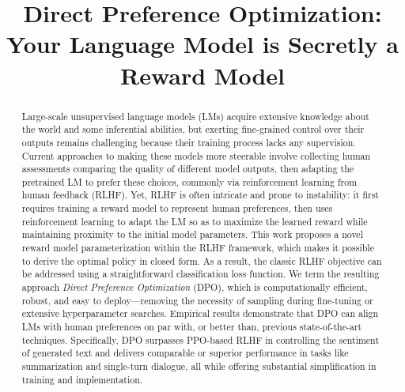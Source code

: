 \title{Direct Preference Optimization: Your Language Model is Secretly a Reward Model}

\begin{abstract}
Large-scale unsupervised language models (LMs) acquire extensive knowledge about the world and some inferential abilities, but exerting fine-grained control over their outputs remains challenging because their training process lacks any supervision. Current approaches to making these models more steerable involve collecting human assessments comparing the quality of different model outputs, then adapting the pretrained LM to prefer these choices, commonly via reinforcement learning from human feedback (RLHF). Yet, RLHF is often intricate and prone to instability: it first requires training a reward model to represent human preferences, then uses reinforcement learning to adapt the LM so as to maximize the learned reward while maintaining proximity to the initial model parameters. This work proposes a novel reward model parameterization within the RLHF framework, which makes it possible to derive the optimal policy in closed form. As a result, the classic RLHF objective can be addressed using a straightforward classification loss function. We term the resulting approach \textit{Direct Preference Optimization} (DPO), which is computationally efficient, robust, and easy to deploy—removing the necessity of sampling during fine-tuning or extensive hyperparameter searches. Empirical results demonstrate that DPO can align LMs with human preferences on par with, or better than, previous state-of-the-art techniques. Specifically, DPO surpasses PPO-based RLHF in controlling the sentiment of generated text and delivers comparable or superior performance in tasks like summarization and single-turn dialogue, all while offering substantial simplification in training and implementation.
\end{abstract}

